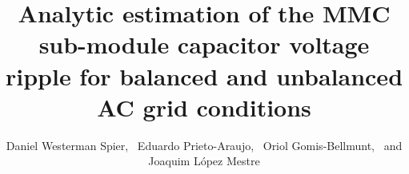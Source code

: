 \documentclass[journal]{IEEEtran}
\begin{document}
%
\title{Analytic estimation of the MMC sub-module capacitor voltage ripple for balanced and unbalanced AC grid conditions}
%
%
%

\author{Daniel Westerman Spier,~ Eduardo Prieto-Araujo,~ Oriol Gomis-Bellmunt,~ and Joaquim L\'opez Mestre}%

% 
%



% 
\end{document}

